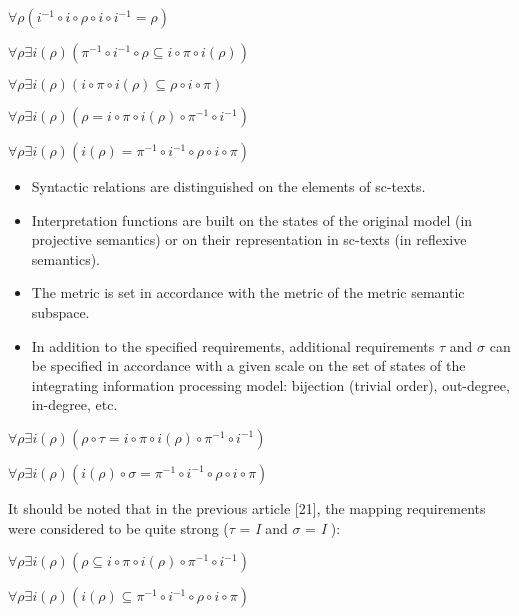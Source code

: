 \documentclass{article}
\begin{document}
\begin{multicols}{2}
\centerline{$\forall \rho \left(i^{-1} \circ i \circ \rho \circ i \circ i^{-1} = \rho\right)$} 
\vspace{19pt}
\centerline{$\forall \rho \exists i(\rho) \left(\pi^{-1} \circ i^{-1} \circ \rho \subseteq i \circ \pi \circ i(\rho)\right)$ } 
\vspace{19pt}
\centerline{$\forall \rho \exists i(\rho) \left(i \circ \pi \circ i(\rho) \subseteq \rho \circ i \circ \pi\right)$}
\vspace{19pt}
\centerline{$\forall \rho \exists i(\rho) \left(\rho = i \circ \pi \circ i(\rho) \circ \pi^{-1} \circ i^{-1}\right)$}
\vspace{19pt}
\centerline{$\forall \rho \exists i(\rho) \left(i(\rho) = \pi^{-1} \circ i^{-1} \circ \rho \circ i \circ \pi\right)$}
 
\vspace{0.5pt}
\begin{itemize}
    \item Syntactic relations are distinguished on the elements
of sc-texts.\!
    \item Interpretation functions are built on the states of the
original model (in projective semantics) or on their
representation in sc-texts (in reflexive semantics).\!
    \item The metric is set in accordance with the metric of
the metric semantic subspace.\!
    \item In addition to the specified requirements, additional
requirements $\tau$ and $\sigma$ can be specified in accordance
with a given scale on the set of states of the
integrating information processing model: bijection
(trivial order), out-degree, in-degree, etc.\!
\end{itemize}


\centerline{$\forall \rho \exists i(\rho) \left(\rho \circ \tau = i \circ \pi \circ i(\rho) \circ \pi^{-1} \circ i^{-1}\right)$}
\vspace{19pt}
\centerline{$\forall \rho \exists i(\rho) \left(i(\rho) \circ \sigma = \pi^{-1} \circ i^{-1} \circ \rho \circ i \circ \pi\right)$}

\vspace{0.5pt}
It should be noted that in the previous article [21], the
mapping requirements were considered to be quite strong
($\tau$ = \textit{I} and $\sigma$ = \textit{I} ):


\centerline{$\forall \rho \exists i (\rho) (\rho \subseteq i \circ \pi \circ i(\rho) \circ \pi^{-1} \circ i^{-1})$}
\vspace{19pt}
\centerline{$\forall \rho \exists i(\rho) (i(\rho) \subseteq \pi^{-1} \circ i^{-1} \circ \rho \circ i \circ \pi)$}



\end{multicols}
\end{document}
